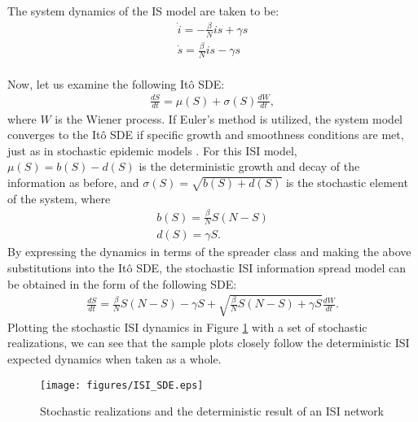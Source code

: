 \noindent The system dynamics of the IS model are taken to be:
\begin{equation}\label{eqn:ISI_dynamics_2}
\left.\begin{aligned}
\dot{i} = -\frac{\beta}{N} i s+\gamma s\\
\dot{s} = \frac{\beta}{N} i s-\gamma s
\end{aligned}\right.
\end{equation}\\
\noindent Now, let us examine the following It\^o SDE:
\begin{equation}\label{eqn:Ito_ISI}
\left.\begin{aligned}
\frac{dS}{dt}= \mu(S) + \sigma(S) \frac{dW}{dt},
\end{aligned}\right.
\end{equation}
\noindent where $W$ is the Wiener process. If Euler's method is utilized, the system model converges to the It\^o SDE if specific growth and smoothness conditions are met, just as in stochastic epidemic models \cite{allen2008mathematical}. For this ISI model, $\mu(S)=b(S)-d(S)$ is the deterministic growth and decay of the information as before, and $\sigma(S)=\sqrt{b(S)+d(S)}$ is the stochastic element of the system, where
\begin{equation}\label{eqn:Ito_coeff}
\left.\begin{aligned}
b(S) = \frac{\beta}{N} S(N-S) \nonumber \\
d(S)= \gamma S. \nonumber
\end{aligned}\right.
\end{equation}
\noindent By expressing the dynamics in terms of the spreader class and making the above substitutions into the It\^o SDE, the stochastic ISI information spread model can be obtained in the form of the following SDE:
\begin{equation}\label{eqn:ISI_SDE}
\left.\begin{aligned}
\frac{dS}{dt} = \frac{\beta}{N} S(N-S)- \gamma S + \sqrt{\frac{\beta}{N} S(N-S)+\gamma S} \frac{dW}{dt}.
\end{aligned}\right.
\end{equation}
\noindent Plotting the stochastic ISI dynamics in Figure \ref{fig:ISI_SDE} with a set of stochastic realizations, we can see that the sample plots closely follow the deterministic ISI expected dynamics when taken as a whole.
\begin{figure}[!htbp] \centering
  \texttt{[image: figures/ISI\_SDE.eps]}
  \caption{Stochastic realizations and the deterministic result of an ISI network}
  \label{fig:ISI_SDE}
\end{figure}

